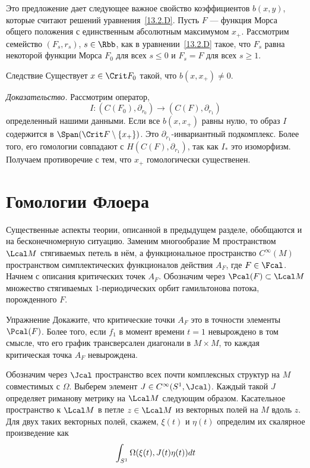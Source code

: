 Это предложение дает следующее важное свойство коэффициентов $b(x,
y)$, которые считают   решений
уравнения~\ref{13.2.D}. 
Пусть $F$ --- функция Морса общего положения с единственным абсолютным
максимумом $x_{+}$.
Рассмотрим семейство $(F_{s},r_{s})$, $s\in\Rbb$, как в
уравнении~\ref{13.2.D} такое, что $F_{s}$ равна некоторой функции
Морса $F_{0}$ для всех $s\leq0$ и $F_{s} = F$ для всех $s\geq1$.


\begin{thm}{Следствие}\label{13.2.H}
  Существует $x\in\Crit F_{0}$ такой, что $b(x, x_{+})\neq0$.  
\end{thm}

\noindent\textit{Доказательство.}
Рассмотрим оператор,
\[
I:(C(F_{0}),\partial_{r_{0}})\to (C(F),\partial_{r_{1}})
\]
определенный нашими данными.
Если все $b(x,x_{+})$ равны нулю, то образ $I$ содержится в
$\Span(\Crit F\setminus\{x_{+}\})$. 
Это $\partial_{r_{1}}$-инвариантный подкомплекс.
Более того, его гомологии совпадают с $H(C(F),\partial_{r_{1}})$,
так как $I_{*}$ это изоморфизм.
Получаем противоречие с тем, что $x_{+}$ гомологически существенен.
\qeds

\section{Гомологии Флоера}\label{13.3}
Существенные аспекты теории, описанной в предыдущем разделе,
обобщаются и на бесконечномерную ситуацию.  Заменим многообразие $М$
пространством $\Lcal M$ стягиваемых петель в нём, а функциональное
пространство $C^{\infty}(M)$ пространством симплектических
функционалов действия $A_{F}$, где $F\in\Fcal$.
Начнем с описания критических точек $A_{F}$.
Обозначим через $\Pcal(F)\subset\Lcal M$ множество стягиваемых
$1$-периодических орбит гамильтонова потока, порожденного $F$.

\begin{ex}{Упражнение}\label{13.3.A}
  Докажите, что критические точки $A_{F}$ это в точности элементы
  $\Pcal(F)$.
  Более того, если  $f_{1}$ в момент времени
    $t=1$ невырождено в том смысле, что его график
  трансверсален диагонали в $M\times M$, то каждая критическая точка
  $A_{F}$ невырождена.
\end{ex}
Обозначим через $\Jcal$ пространство всех почти комплексных структур
на $M$ совместимых с $\Omega$.
Выберем элемент $J\in C^{\infty}(S^{1},\Jcal)$.
Каждый такой $J$ определяет риманову метрику на $\Lcal M$ следующим образом.
Касательное пространство к $\Lcal M$ в петле $z\in\Lcal M$
 из векторных полей на $M$ вдоль $z$.
Для двух таких векторных полей, скажем, $\xi(t)$ и $\eta(t)$ определим
их скалярное произведение как
\[
\int_{S^{1}}\Omega(\xi(t),J(t)\eta(t))d t
\]

